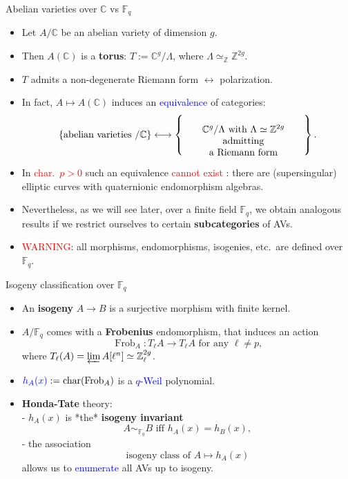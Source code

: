 \documentclass[usenames,dvipsnames,handout]{beamer}
\def\Z{\mathbb{Z}}
\def\C{\mathbb{C}}
\def\F{\mathbb{F}}
\DeclareMathOperator{\Char}{char}
\DeclareMathOperator{\Frob}{Frob}
\newcommand{\set}[1]{\left\lbrace#1\right\rbrace }
\newcommand{\red}[1]{\textcolor{red}{#1}}
\newcommand{\blue}[1]{\textcolor{blue}{#1}}
\begin{document}
\begin{frame}{ Abelian varieties over $\C$ vs $\F_q$ }    
    \begin{itemize}
     \item Let $A/\C$ be an abelian variety of dimension $g$. 
\pause
    \item Then $A(\C)$ is a {\bf torus}: $T:=\C^g/\Lambda$, where $\Lambda\simeq_\Z\Z^{2g}$.
\pause 
    \item $T$ admits a non-degenerate Riemann form $\longleftrightarrow$ polarization.
\pause
    \item In fact, $ A \mapsto A(\C)$ induces an \blue{equivalence} of categories:
    \vspace{-.2cm}
	  \[
      \set{ \text{abelian varieties $/\C$} } \longleftrightarrow 
      \set{\parbox[c]{12.5em}{\center $\C^g/\Lambda$ with $\Lambda\simeq \Z^{2g}$ admitting\\ a Riemann form}}.
     \]
\pause
    \vspace{-.5cm}
    \item In \red{char.~$p>0$} such an equivalence \red{cannot exist} : there are (supersingular) elliptic curves with quaternionic endomorphism algebras.
\pause 
    \item Nevertheless, as we will see later, over a finite field $\F_q$, we obtain analogous results if we restrict ourselves to certain {\bf subcategories} of AVs.
\pause
    \item \red{WARNING}: all morphisms, endomorphisms, isogenies, etc.~are defined over $\F_q$.
	\end{itemize}
\end{frame}

\begin{frame}{ Isogeny classification over $\F_q$}
	\begin{itemize}
    \item An {\bf isogeny} $A\to B$ is a surjective morphism with finite kernel.
\pause     
    \item $A/\F_{q}$ comes with a {\bf Frobenius} endomorphism, 
\pause
    that induces an action
		\[ \Frob_A : T_\ell A \rightarrow T_\ell A \text{ for any }\ell\neq p, \]
		where $T_\ell(A) = \varprojlim A[\ell^n] \simeq \Z_\ell^{2g}$.
\pause
    \item $\blue{h_A(x)}:=\Char(\Frob_A)$ is a \blue{$q$-Weil} polynomial.
\pause
    \item {\bf Honda-Tate} theory:\\
        - $h_A(x)$ is *the* {\bf isogeny invariant} 
        \[ A\sim_{\F_q} B \text{ iff } h_A(x) = h_B(x), \]
\pause
        - the association
		\[ \text{isogeny class of }A \longmapsto h_A(x) \]
		allows us to \blue{enumerate} all AVs up to isogeny.
	\end{itemize}
\end{frame}
\end{document}
